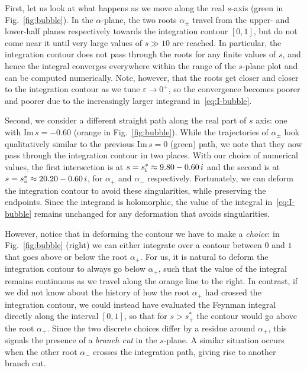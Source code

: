 \documentclass[12pt]{article}
\numberwithin{figure}{section}
\def \eps {\varepsilon}
\def \Im {\mathrm{Im}}
\newcommand{\RN}[1]{\textup{\uppercase\expandafter{\romannumeral#1}}}
\begin{document}
	First, let us look at what happens as we move along the real $s$-axis (green in Fig.~\ref{fig:bubble}). In the $\alpha$-plane, the two roots $\alpha_\pm$ travel from the upper- and lower-half planes respectively towards the integration contour $[0,1]$, but do not come near it until very large values of $s \gg 10$ are reached. In particular, the integration contour does not pass through the roots for any finite values of $s$, and hence the integral converges everywhere within the range of the $s$-plane plot and can be computed numerically. Note, however, that the roots get closer and closer to the integration contour as we tune $\eps \to 0^+$, so the convergence becomes poorer and poorer due to the increasingly larger integrand in~\eqref{eq:I-bubble}.
	
	Second, we consider a different straight path along the real part of $s$ axis: one with $\Im\, s = -0.60$ (orange in Fig.~\ref{fig:bubble}). While the trajectories of $\alpha_{\pm}$ look qualitatively similar to the previous $\Im\, s=0$ (green) path, we note that they now pass through the integration contour in two places. With our choice of numerical values, the first intersection is at $s = s_{\RN{1}}^\ast \approx 9.80 - 0.60\,i$ and the second is at $s = s_{\RN{2}}^\ast \approx 20.20 - 0.60\,i$, for $\alpha_+$ and $\alpha_-$ respectively.
	Fortunately, we can deform the integration contour to avoid these singularities, while preserving the endpoints. Since the integrand is holomorphic, the value of the integral in~\eqref{eq:I-bubble} remains unchanged for any deformation that avoids singularities.
	
	However, notice that in deforming the contour we have to make a \emph{choice}: in Fig.~\ref{fig:bubble} (right) we can either integrate over a contour between $0$ and $1$ that goes above or below the root $\alpha_+$. For us, it is natural to deform the integration contour to always go below $\alpha_+$, such that the value of the integral remains continuous as we travel along the orange line to the right. In contrast, if we did not know about the history of how the root $\alpha_+$ had crossed the integration contour, we could instead have evaluated the Feynman integral directly along the interval $[0,1]$, so that for $s>s_+^\ast$ the contour would go above the root $\alpha_+$. Since the two discrete choices differ by a residue around $\alpha_+$, this signals the presence of a \textit{branch cut} in the $s$-plane. A similar situation occurs when the other root $\alpha_-$ crosses the integration path, giving rise to another branch cut.
	
\end{document}
